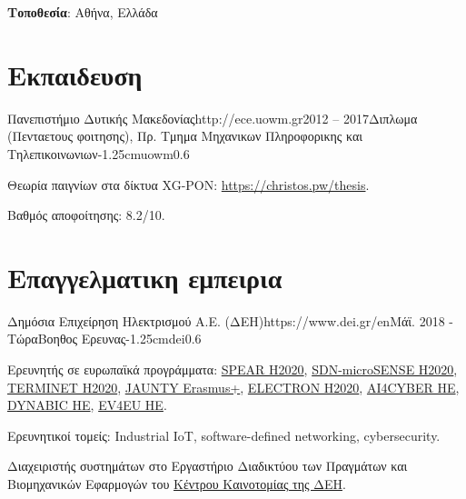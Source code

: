 \documentclass{mycv}
\begin{document}
	\thispagestyle{plain}
	\begin{center}
		\centering
		{\bf Τοποθεσία}: Αθήνα, Ελλάδα
	\end{center}
	\section{Εκπαιδευση}
	
	\begin{EntryDatedLogo}{Πανεπιστήμιο Δυτικής Μακεδονίας}{http://ece.uowm.gr}{2012 -- 2017}{Διπλωμα (Πενταετους φοιτησης), Πρ. Τμημα Μηχανικων Πληροφορικης και Τηλεπικοινωνιων}{-1.25cm}{uowm}{0.6}
		\begin{Itemize}
			\item Θεωρία παιγνίων στα δίκτυα XG-PON: \url{https://christos.pw/thesis}.
			\item Βαθμός αποφοίτησης: 8.2/10.
		\end{Itemize}
	\end{EntryDatedLogo}
	
	\section{Επαγγελματικη εμπειρια}
	\begin{EntryDatedLogo}{Δημόσια Επιχείρηση Ηλεκτρισμού Α.Ε. (ΔΕΗ)}{https://www.dei.gr/en}{Μάϊ. 2018 - Τώρα}{Βοηθος Ερευνας}{-1.25cm}{dei}{0.6}
	\begin{Itemize}
		\item Ερευνητής σε ευρωπαϊκά προγράμματα: \href{https://cordis.europa.eu/project/id/787011}{SPEAR H2020}, \href{https://cordis.europa.eu/project/id/833955}{SDN-microSENSE H2020}, \href{https://cordis.europa.eu/project/id/957406}{TERMINET H2020}, \href{https://www.jaunty.eu/}{JAUNTY Erasmus+}, \href{https://cordis.europa.eu/project/id/101021936}{ELECTRON H2020}, \href{https://cordis.europa.eu/project/id/101070450}{AI4CYBER HE}, \href{https://cordis.europa.eu/project/id/101070455}{DYNABIC HE}, \href{https://cordis.europa.eu/project/id/101056765}{EV4EU HE}.
		\item Ερευνητικοί τομείς: Industrial IoT, software-defined networking, cybersecurity.
		\item Διαχειριστής συστημάτων στο Εργαστήριο Διαδικτύου των Πραγμάτων και Βιομηχανικών Εφαρμογών του \href{https://innovationhub.dei.gr/el/}{Κέντρου Καινοτομίας της ΔΕΗ}.

	\end{Itemize}
	\end{EntryDatedLogo}
\end{document}
